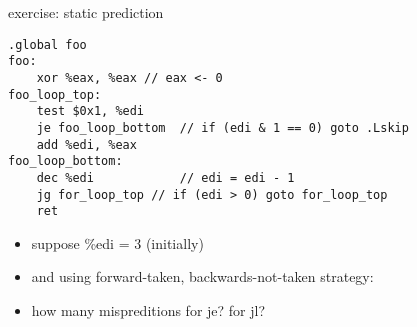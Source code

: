 \begin{frame}[fragile,label=staticPredictEx]{exercise: static prediction}
\begin{lstlisting}[language=myasm,style=smaller]
.global foo
foo:
    xor %eax, %eax // eax <- 0
foo_loop_top:
    test $0x1, %edi
    je foo_loop_bottom  // if (edi & 1 == 0) goto .Lskip
    add %edi, %eax 
foo_loop_bottom:
    dec %edi            // edi = edi - 1
    jg for_loop_top // if (edi > 0) goto for_loop_top
    ret
\end{lstlisting}
\begin{itemize}
\item suppose \%edi = 3 (initially)
\item and using forward-taken, backwards-not-taken strategy:
\item how many mispreditions for je? for jl?
\end{itemize}
\end{frame}
